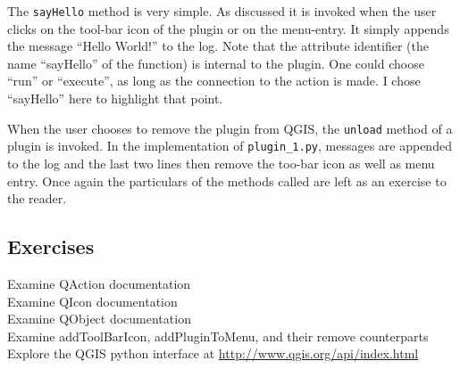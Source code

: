 \par%
The \lstinline{sayHello} method is very simple. As discussed it is invoked when the user clicks on the tool-bar icon of the plugin or on the menu-entry. It simply appends the message ``Hello World!'' to the log.  Note that the attribute identifier (the name ``sayHello'' of the function) is internal to the plugin. One could choose ``run'' or ``execute'', as long as the connection to the action is made. I chose ``sayHello'' here to highlight that point.
\par%
When the user chooses to remove the plugin from QGIS, the \lstinline{unload} method of a plugin is invoked. In the implementation of \lstinline{plugin_1.py}, messages are appended to the log and the last two lines then remove the too-bar icon as well as menu entry. Once again the particulars of the methods called are left as an exercise to the reader.

\subsection{Exercises}
\label{ssect:plugin_1_exercises}
Examine QAction documentation\\
Examine QIcon documentation\\
Examine QObject documentation\\
Examine addToolBarIcon, addPluginToMenu, and their remove counterparts\\
Explore the QGIS python interface at \url{http://www.qgis.org/api/index.html}
